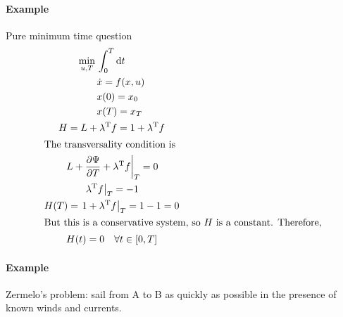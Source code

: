 \paragraph{Example} Pure minimum time question
\begin{gather}
  \begin{aligned}
    \min_{u,T} {} & \int_0^T \mathop{}\!\mathrm{d} t \\
    & \dot x = f(x,u) \\
    & x(0) = x_0 \\
    & x(T) = x_T
  \end{aligned} \\
  H = L + \lambda^\text{T} f = 1 + \lambda^\text{T} f \\
  \shortintertext{The transversality condition is}
  \left. L + \frac{\partial \Psi}{\partial T} + \lambda^\text{T} f \right|_T = 0 \\
  \left. \lambda^\text{T} f \right|_T = -1 \\
  H(T) = \left. 1 + \lambda^\text{T} f \right|_T = 1 - 1 = 0 \\
  \shortintertext{But this is a conservative system, so $H$ is a constant. Therefore,}
  H(t) = 0 \quad \forall t\in[0,T]
\end{gather}

\clearpage
\paragraph{Example} Zermelo's problem: sail from A to B as quickly as possible in the presence of known winds and currents.

